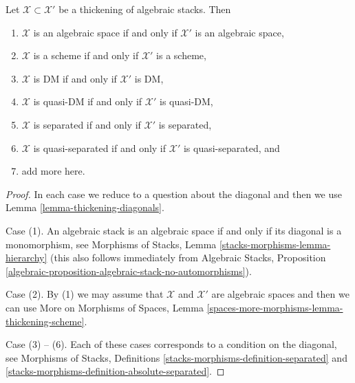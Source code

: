 \begin{lemma}
\label{lemma-thickening-properties}
Let $\mathcal{X} \subset \mathcal{X}'$ be a thickening of algebraic
stacks. Then
\begin{enumerate}
\item $\mathcal{X}$ is an algebraic space if and only if $\mathcal{X}'$
is an algebraic space,
\item $\mathcal{X}$ is a scheme if and only if $\mathcal{X}'$ is a scheme,
\item $\mathcal{X}$ is DM if and only if $\mathcal{X}'$ is DM,
\item $\mathcal{X}$ is quasi-DM if and only if $\mathcal{X}'$ is quasi-DM,
\item $\mathcal{X}$ is separated if and only if $\mathcal{X}'$ is separated,
\item $\mathcal{X}$ is quasi-separated if and only if $\mathcal{X}'$ is
quasi-separated, and
\item add more here.
\end{enumerate}
\end{lemma}

\begin{proof}
In each case we reduce to a question about the diagonal and then
we use Lemma \ref{lemma-thickening-diagonals}.

\medskip\noindent
Case (1). An algebraic stack is an algebraic space if and only if its
diagonal is a monomorphism, see
Morphisms of Stacks, Lemma \ref{stacks-morphisms-lemma-hierarchy}
(this also follows immediately from Algebraic Stacks,
Proposition \ref{algebraic-proposition-algebraic-stack-no-automorphisms}).

\medskip\noindent
Case (2). By (1) we may assume that $\mathcal{X}$ and $\mathcal{X}'$
are algebraic spaces and then we can use
More on Morphisms of Spaces, Lemma
\ref{spaces-more-morphisms-lemma-thickening-scheme}.

\medskip\noindent
Case (3) -- (6). Each of these cases corresponds to a condition
on the diagonal, see Morphisms of Stacks, Definitions
\ref{stacks-morphisms-definition-separated} and
\ref{stacks-morphisms-definition-absolute-separated}.
\end{proof}























